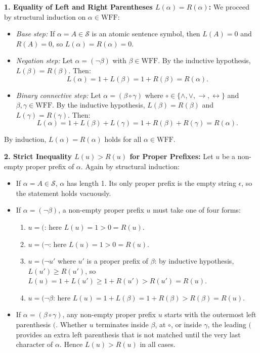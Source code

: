 \begin{solution}
\textbf{1. Equality of Left and Right Parentheses $L(\alpha) = R(\alpha)$:}
We proceed by structural induction on $\alpha \in \mathrm{WFF}$:
\begin{itemize}[leftmargin=1.4em,itemsep=2pt]
  \item \textit{Base step:} If $\alpha = A \in \mathcal{S}$ is an atomic sentence symbol, then $L(A) = 0$ and $R(A) = 0$, so $L(\alpha) = R(\alpha) = 0$.
  \item \textit{Negation step:} Let $\alpha = (\neg \beta)$ with $\beta \in \mathrm{WFF}$. By the inductive hypothesis, $L(\beta) = R(\beta)$. Then:
  \[
  L(\alpha) = 1 + L(\beta) = 1 + R(\beta) = R(\alpha).
  \]
  \item \textit{Binary connective step:} Let $\alpha = (\beta \circ \gamma)$ where $\circ \in \{\land, \lor, \to, \leftrightarrow\}$ and $\beta, \gamma \in \mathrm{WFF}$.
  By the inductive hypothesis, $L(\beta) = R(\beta)$ and $L(\gamma) = R(\gamma)$. Then:
  \[
  L(\alpha) = 1 + L(\beta) + L(\gamma) = 1 + R(\beta) + R(\gamma) = R(\alpha).
  \]
\end{itemize}
By induction, $L(\alpha) = R(\alpha)$ holds for all $\alpha \in \mathrm{WFF}$.

\textbf{2. Strict Inequality $L(u) > R(u)$ for Proper Prefixes:}
Let $u$ be a non-empty proper prefix of $\alpha$. Again by structural induction:
\begin{itemize}[leftmargin=1.4em,itemsep=2pt]
  \item If $\alpha = A \in \mathcal{S}$, $\alpha$ has length 1. Its only proper prefix is the empty string $\epsilon$, so the statement holds vacuously.
  \item If $\alpha = (\neg \beta)$, a non-empty proper prefix $u$ must take one of four forms:
  \begin{enumerate}[leftmargin=1.2em,itemsep=1pt]
    \item $u = ($: here $L(u) = 1 > 0 = R(u)$.
    \item $u = (\neg$: here $L(u) = 1 > 0 = R(u)$.
    \item $u = (\neg u'$ where $u'$ is a proper prefix of $\beta$: by inductive hypothesis, $L(u') \ge R(u')$, so $L(u) = 1 + L(u') \ge 1 + R(u') > R(u') = R(u)$.
    \item $u = (\neg \beta$: here $L(u) = 1 + L(\beta) = 1 + R(\beta) > R(\beta) = R(u)$.
  \end{enumerate}
  \item If $\alpha = (\beta \circ \gamma)$, any non-empty proper prefix $u$ starts with the outermost left parenthesis $($.
  Whether $u$ terminates inside $\beta$, at $\circ$, or inside $\gamma$, the leading $($ provides an extra left parenthesis that is not matched until the very last character of $\alpha$. Hence $L(u) > R(u)$ in all cases.
\end{itemize}


\end{solution}
